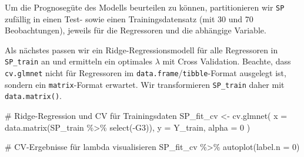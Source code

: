 \documentclass[
  a4paper,
  DIV=11,
  oneside]{scrreprt}
\newenvironment{Shaded}{\begin{snugshade}}{\end{snugshade}}
\newcommand{\AttributeTok}[1]{\textcolor[rgb]{0.40,0.45,0.13}{#1}}
\newcommand{\CommentTok}[1]{\textcolor[rgb]{0.37,0.37,0.37}{#1}}
\newcommand{\DecValTok}[1]{\textcolor[rgb]{0.68,0.00,0.00}{#1}}
\newcommand{\FunctionTok}[1]{\textcolor[rgb]{0.28,0.35,0.67}{#1}}
\newcommand{\NormalTok}[1]{\textcolor[rgb]{0.00,0.23,0.31}{#1}}
\newcommand{\OtherTok}[1]{\textcolor[rgb]{0.00,0.23,0.31}{#1}}
\newcommand{\SpecialCharTok}[1]{\textcolor[rgb]{0.37,0.37,0.37}{#1}}
\begin{document}
Um die Prognosegüte des Modells beurteilen zu können, partitionieren wir
\texttt{SP} zufällig in einen Test- sowie einen Trainingsdatensatz (mit
30 und 70 Beobachtungen), jeweils für die Regressoren und die abhängige
Variable.

\begin{Shaded}
\end{Shaded}

Als nächstes passen wir ein Ridge-Regressionsmodell für alle Regressoren
in \texttt{SP\_train} an und ermitteln ein optimales \(\lambda\) mit
Cross Validation. Beachte, dass \texttt{cv.glmnet} nicht für Regressoren
im \texttt{data.frame}/\texttt{tibble}-Format ausgelegt ist, sondern ein
\texttt{matrix}-Format erwartet. Wir transformieren \texttt{SP\_train}
daher mit \texttt{data.matrix()}.

\begin{Shaded}
\begin{Highlighting}[]
\CommentTok{\# Ridge{-}Regression und CV für Trainingsdaten}
\NormalTok{SP\_fit\_cv }\OtherTok{\textless{}{-}} \FunctionTok{cv.glmnet}\NormalTok{(}
  \AttributeTok{x =} \FunctionTok{data.matrix}\NormalTok{(SP\_train }\SpecialCharTok{\%\textgreater{}\%} \FunctionTok{select}\NormalTok{(}\SpecialCharTok{{-}}\NormalTok{G3)), }
  \AttributeTok{y =}\NormalTok{ Y\_train, }
  \AttributeTok{alpha =} \DecValTok{0}
\NormalTok{)}

\CommentTok{\# CV{-}Ergebnisse für lambda visualisieren}
\NormalTok{SP\_fit\_cv }\SpecialCharTok{\%\textgreater{}\%} 
  \FunctionTok{autoplot}\NormalTok{(}\AttributeTok{label.n =} \DecValTok{0}\NormalTok{)}
\end{Highlighting}
\end{Shaded}
\end{document}
